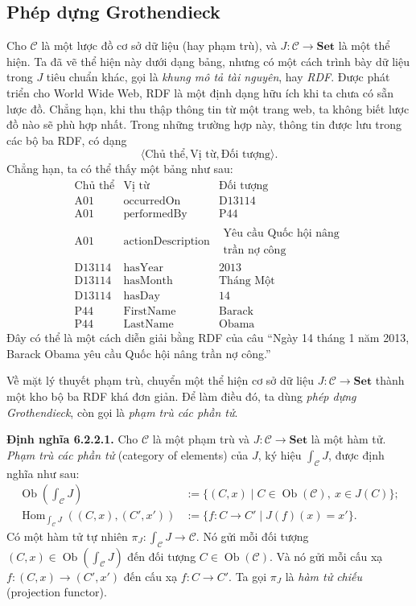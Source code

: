 \subsection{Phép dựng Grothendieck}
Cho $\mathcal C$ là một lược đồ cơ sở dữ liệu (hay phạm trù), và $J:\mathcal C\to\mathbf{Set}$ là một thể hiện. Ta đã vẽ thể hiện này dưới dạng bảng, nhưng có một cách trình bày dữ liệu trong $J$ tiêu chuẩn khác, gọi là \emph{khung mô tả tài nguyên}, hay \emph{RDF}. Được phát triển cho World Wide Web, RDF là một định dạng hữu ích khi ta chưa có sẵn lược đồ. Chẳng hạn, khi thu thập thông tin từ một trang web, ta không biết lược đồ nào sẽ phù hợp nhất. Trong những trường hợp này, thông tin được lưu trong các bộ ba RDF, có dạng
\[\langle\text{Chủ thể},\text{Vị từ},\text{Đối tượng}\rangle.\]
Chẳng hạn, ta có thể thấy một bảng như sau:
\begin{equation}\begin{array}{lll}\text{Chủ thể}&\text{Vị từ}&\text{Đối tượng}\\\hline
\text{A01}&\text{occurredOn}&\text{D13114}\\
\text{A01}&\text{performedBy}&\text{P44}\\
\text{A01}&\text{actionDescription}&\begin{gathered}\text{Yêu cầu Quốc hội nâng}\\\text{trần nợ công}\end{gathered}\\
\text{D13114}&\text{hasYear}&2013\\
\text{D13114}&\text{hasMonth}&\text{Tháng Một}\\
\text{D13114}&\text{hasDay}&14\\
\text{P44}&\text{FirstName}&\text{Barack}\\
\text{P44}&\text{LastName}&\text{Obama}
\end{array}\tag{6.9}\end{equation}
Đây có thể là một cách diễn giải bằng RDF của câu ``Ngày 14 tháng 1 năm 2013, Barack Obama yêu cầu Quốc hội nâng trần nợ công.''

Về mặt lý thuyết phạm trù, chuyển một thể hiện cơ sở dữ liệu $J:\mathcal C\to\mathbf{Set}$ thành một kho bộ ba RDF khá đơn giản. Để làm điều đó, ta dùng \emph{phép dựng Grothendieck}, còn gọi là \emph{phạm trù các phần tử}.

\noindent\textbf{Định nghĩa 6.2.2.1.} Cho $\mathcal C$ là một phạm trù và $J:\mathcal C\to\mathbf{Set}$ là một hàm tử. \emph{Phạm trù các phần tử} (category of elements) của $J$, ký hiệu $\int_{\mathcal C}J$, được định nghĩa như sau:
\[\begin{aligned}\operatorname{Ob}\left(\int_{\mathcal C}J\right)&:=\{(C,x)\mid C\in\operatorname{Ob}(\mathcal C),\ x\in J(C)\};\\\operatorname{Hom}_{\int_{\mathcal C}J}((C,x),(C',x'))&:=\{f:C\to C'\mid J(f)(x)=x'\}.\end{aligned}\]
Có một hàm tử tự nhiên $\pi_J:\int_{\mathcal C}J\to\mathcal C$. Nó gửi mỗi đối tượng $(C,x)\in\operatorname{Ob}(\int_{\mathcal C}J)$ đến đối tượng $C\in\operatorname{Ob}(\mathcal C)$. Và nó gửi mỗi cấu xạ $f:(C,x)\to(C',x')$ đến cấu xạ $f:C\to C'$. Ta gọi $\pi_J$ là \emph{hàm tử chiếu} (projection functor).

